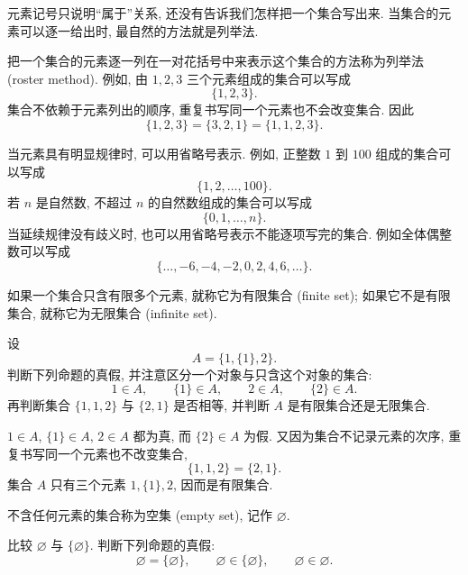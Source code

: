 \documentclass[usesamecnt, thmcnt=section, lang=cn, newtx, 10pt, scheme=chinese]{elegantbook}
\begin{document}
元素记号只说明``属于''关系, 还没有告诉我们怎样把一个集合写出来. 当集合的元素可以逐一给出时, 最自然的方法就是列举法.

\begin{notation}[列举法]\label{not:sets-roster}
把一个集合的元素逐一列在一对花括号中来表示这个集合的方法称为{\color{blue}列举法 (roster method)}. 例如, 由 $1,2,3$ 三个元素组成的集合可以写成
\[
 \{1,2,3\}.
\]
集合不依赖于元素列出的顺序, 重复书写同一个元素也不会改变集合. 因此
\[
 \{1,2,3\}=\{3,2,1\}=\{1,1,2,3\}.
\]

当元素具有明显规律时, 可以用省略号表示. 例如, 正整数 $1$ 到 $100$ 组成的集合可以写成
\[
 \{1,2,\ldots,100\}.
\]
若 $n$ 是自然数, 不超过 $n$ 的自然数组成的集合可以写成
\[
 \{0,1,\ldots,n\}.
\]
当延续规律没有歧义时, 也可以用省略号表示不能逐项写完的集合. 例如全体偶整数可以写成
\[
 \{\ldots,-6,-4,-2,0,2,4,6,\ldots\}.
\]
\end{notation}

\begin{definition}[有限集合与无限集合]
如果一个集合只含有限多个元素, 就称它为{\color{blue}有限集合 (finite set)}; 如果它不是有限集合, 就称它为{\color{blue}无限集合 (infinite set)}.
\end{definition}

\begin{concept}\label{con:sets-01}
设
\[
 A=\{1,\{1\},2\}.
\]
判断下列命题的真假, 并注意区分一个对象与只含这个对象的集合:
\[
 1\in A,\qquad \{1\}\in A,\qquad 2\in A,\qquad \{2\}\in A.
\]
再判断集合 $\{1,1,2\}$ 与 $\{2,1\}$ 是否相等, 并判断 $A$ 是有限集合还是无限集合.
\end{concept}

\begin{solution}
$1\in A$, $\{1\}\in A$, $2\in A$ 都为真, 而 $\{2\}\in A$ 为假. 又因为集合不记录元素的次序, 重复书写同一个元素也不改变集合,
\[
 \{1,1,2\}=\{2,1\}.
\]
集合 $A$ 只有三个元素 $1,\{1\},2$, 因而是有限集合.
\end{solution}


\begin{definition}\label{def:sets-empty}
不含任何元素的集合称为{\color{blue}空集 (empty set)}, 记作
$
 \varnothing$.

\end{definition}

\begin{concept}\label{con:sets-04}
比较 $\varnothing$ 与 $\{\varnothing\}$. 判断下列命题的真假:
\[
 \varnothing=\{\varnothing\},\qquad
 \varnothing\in\{\varnothing\},\qquad
 \varnothing\in\varnothing.
\]
\end{concept}
\end{document}
